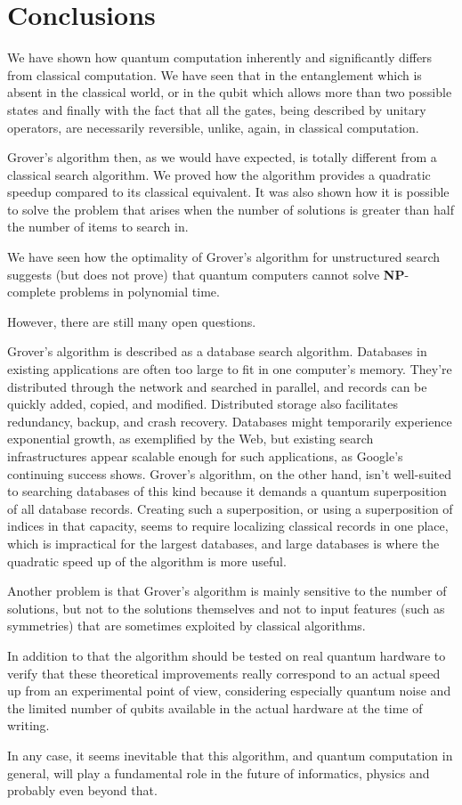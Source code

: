 \chapter{Conclusions}
We have shown how quantum computation inherently and significantly differs from classical computation.
We have seen that in the entanglement which is absent in the classical world, or in the qubit which allows more than two possible states and finally with the fact that all the gates, being described by unitary operators, are necessarily reversible, unlike, again, in classical computation.

\bigskip
Grover's algorithm then, as we would have expected, is totally different from a classical search algorithm. We proved how the algorithm provides a quadratic speedup compared to its classical equivalent. It was also shown how it is possible to solve the problem that arises when the number of solutions is greater than half the number of items to search in.

We have seen how the optimality of Grover's algorithm for unstructured search suggests (but does not prove) that quantum computers cannot solve \textbf{NP}-complete problems in polynomial time.

\bigskip
However, there are still many open questions.

Grover's algorithm is described as a database search algorithm. Databases in existing applications are often
too large to fit in one computer’s memory. They’re
distributed through the network and searched in parallel, and records can be quickly added, copied, and
modified. Distributed storage also facilitates redundancy, backup, and crash recovery.  Databases
might temporarily experience exponential growth, as
exemplified by the Web, but existing search infrastructures appear scalable enough for such applications, as Google’s continuing success shows. Grover’s
algorithm, on the other hand, isn’t well-suited to
searching databases of this kind because it demands a quantum superposition of all database
records. Creating such a superposition, or using a superposition of indices in that capacity, seems to require localizing classical records in one place, which
is impractical for the largest databases, and large databases is where the quadratic speed up of the algorithm is more useful.

\bigskip
Another problem is that Grover’s algorithm is mainly sensitive to the number of solutions, but not to the solutions themselves and not to input
features (such as symmetries) that are sometimes exploited
by classical algorithms.

\bigskip
In addition to that the algorithm should be tested on real quantum hardware to verify that these theoretical improvements really correspond to an actual speed up from an experimental point of view, considering especially quantum noise and the limited number of qubits available in the actual hardware at the time of writing.

\bigskip
In any case, it seems inevitable that this algorithm, and quantum computation in general, will play a fundamental role in the future of informatics, physics and probably even beyond that.